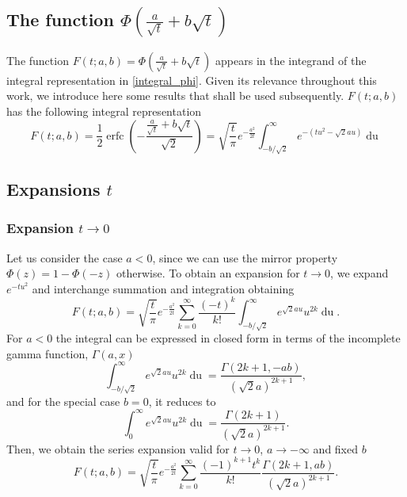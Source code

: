 \documentclass[10pt,a4paper,oneside]{article}
\DeclareMathOperator{\erfc}{erfc}
\numberwithin{equation}{section}
\begin{document}
\begin{appendices}

\section{The function $\Phi\left(\frac{a}{\sqrt{t}} + b\sqrt{t}\right)$}

The function $F(t; a, b) = \Phi\left(\frac{a}{\sqrt{t}} + b\sqrt{t}\right)$ appears in the integrand of the integral representation in \eqref{integral_phi}. Given its relevance throughout this work, we introduce here some results that shall be used subsequently. $F(t; a, b)$ has the following integral representation \cite[\S 7.7.6]{NIST:DLMF}
\begin{equation}\label{integral_erfc_ab}
F(t; a, b) = \frac{1}{2}\erfc\left(-\frac{\frac{a}{\sqrt{t}} + b\sqrt{t}}{\sqrt{2}}\right)  = \sqrt{\frac{t}{\pi}} e^{-\frac{a^2}{2t}} \int_{-b/\sqrt{2}}^{\infty} e^{-(tu^2 - \sqrt{2}au)} \mathop{du}
\end{equation}

\subsection{Expansions $t$}

\subsubsection{Expansion $t \to 0$}

Let us consider the case $a < 0$, since we can use the mirror property $\Phi(z) = 1 - \Phi(-z)$ otherwise. To obtain an expansion for $t \to 0$, we expand $e^{-tu^2}$ and interchange summation and integration obtaining
\begin{equation*}
F(t; a, b) = \sqrt{\frac{t}{\pi}} e^{-\frac{a^2}{2t}} \sum_{k=0}^{\infty} \frac{(-t)^k}{k!}\int_{-b/\sqrt{2}}^{\infty} e^{\sqrt{2}a u} u^{2k}\mathop{du}.
\end{equation*}
For $a < 0$ the integral can be expressed in closed form in terms of the incomplete gamma function, $\Gamma(a, x)$
\begin{equation*}
\int_{-b/\sqrt{2}}^{\infty} e^{\sqrt{2}a u} u^{2k}\mathop{du} = \frac{\Gamma(2k+1, -ab)}{(\sqrt{2}a)^{2k+1}},
\end{equation*}
and for the special case $b=0$, it reduces to
\begin{equation*}
\int_{0}^{\infty} e^{\sqrt{2}a u} u^{2k}\mathop{du} = \frac{\Gamma(2k+1)}{(\sqrt{2}a)^{2k+1}}.
\end{equation*}
Then, we obtain the series expansion valid for $t \to 0$, $a \to -\infty$ and fixed $b$
\begin{equation}\label{phi_expansion_incgamma_t_small}
F(t; a, b) = \sqrt{\frac{t}{\pi}} e^{-\frac{a^2}{2t}} \sum_{k=0}^{\infty} \frac{(-1)^{k+1} t^k}{k!}\frac{\Gamma(2k + 1, ab)}{(\sqrt{2}a)^{2k+1}}.
\end{equation}


\end{appendices}
\end{document}
